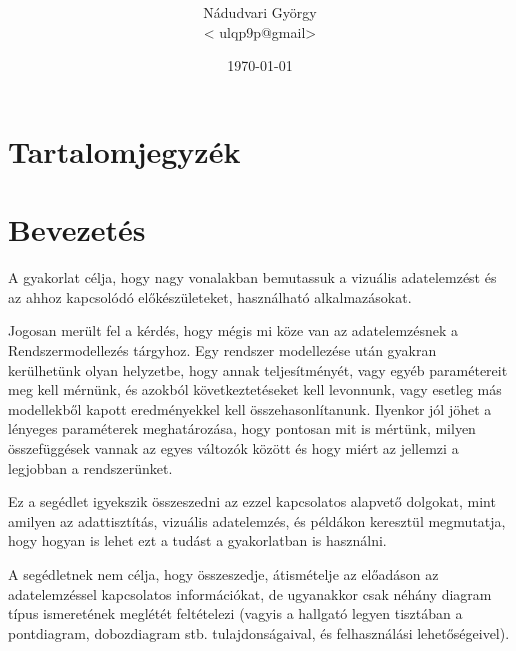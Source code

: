 \documentclass[a4paper,10pt,titlepage]{article}
\makeatletter
\newcommand{\szerzo}{Nádudvari György}
\newcommand{\szerzomail}{ulqp9p@gmail}
\makeatother
\begin{document}


\begin{titlepage}

\title{\colorbox{ftsrg_color}{\parbox{\textwidth}{%
  \vskip40pt
  \center{\textcolor{white}{Rendszermodellezés - 2. gyakorlat \\ Vizuális adatelemzés}}
  \vskip40pt
 }
}}
\author{\szerzo \\ < \szerzomail >}
\date{\today}

\end{titlepage}
\maketitle

\section*{Tartalomjegyzék}
\makeatletter
{}
\makeatother

\newpage

\section{Bevezetés}

A gyakorlat célja, hogy nagy vonalakban bemutassuk a vizuális adatelemzést és az ahhoz kapcsolódó előkészületeket, használható alkalmazásokat.

Jogosan merült fel a kérdés, hogy mégis mi köze van az adatelemzésnek a Rendszermodellezés tárgyhoz. Egy rendszer modellezése után gyakran kerülhetünk olyan helyzetbe, hogy annak teljesítményét, vagy egyéb paramétereit meg kell mérnünk, és azokból következtetéseket kell levonnunk, vagy esetleg más modellekből kapott eredményekkel kell összehasonlítanunk. Ilyenkor jól jöhet a lényeges paraméterek meghatározása, hogy pontosan mit is mértünk, milyen összefüggések vannak az egyes változók között és hogy miért az jellemzi a legjobban a rendszerünket.

Ez a segédlet igyekszik összeszedni az ezzel kapcsolatos alapvető dolgokat, mint amilyen az adattisztítás, vizuális adatelemzés, és példákon keresztül megmutatja, hogy hogyan is lehet ezt a tudást a gyakorlatban is használni.

A segédletnek nem célja, hogy összeszedje, átismételje az előadáson az adatelemzéssel kapcsolatos információkat, de ugyanakkor csak néhány diagram típus ismeretének meglétét feltételezi (vagyis a hallgató legyen tisztában a pontdiagram, dobozdiagram stb. tulajdonságaival, és felhasználási lehetőségeivel). 
\end{document}
